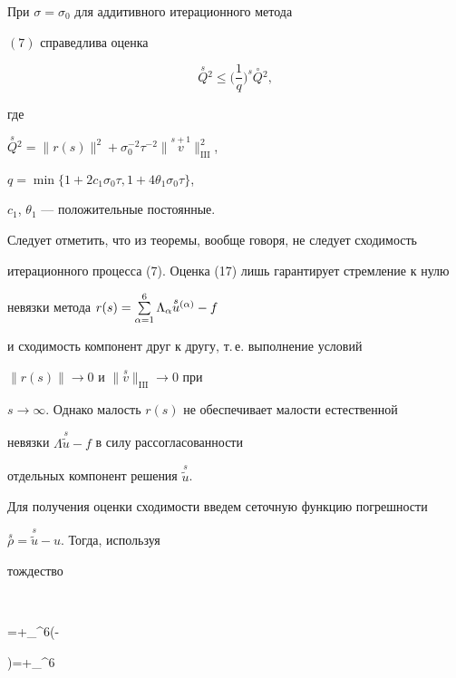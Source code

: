 \begin{thm}


При $\sigma=\sigma_0$ для аддитивного итерационного метода


$(7)$ справедлива оценка


\begin{equation}


\overset{s}{Q}{}^{2} \le \bigg(\frac{1}{q}\bigg)^{s}


\overset{\circ}{Q}{}^{2},


\end{equation}


где


$\overset{s}{Q}{}^{2}=\|r(s)\|^2+\sigma_0^{-2}\tau^{-2}


\|\overset{s+1}{v}\big\|_{\mathrm{III}}^2$,


$q=\min\{1+2c_1\sigma_0\tau,1+4\theta_1\sigma_0\tau\}$,


$c_1$, $\theta_1$ --- положительные постоянные.


\end{thm}





Следует отметить, что из теоремы, вообще говоря, не следует сходимость


итерационного процесса (7). Оценка (17) лишь гарантирует стремление к нулю


невязки метода $r(s)=\sum\limits_{\alpha=1}^6\Lambda_\alpha{\overset{s}{u}{}^{(\alpha)}}-f$


и сходимость компонент друг к другу, т.\,е. выполнение условий


$\|r(s)\|\to 0$ и $\|\overset{s}{v}\big\|_{\mathrm{III}}\to 0$ при


$s\to\infty$. Однако малость $r(s)$ не обеспечивает малости естественной


невязки $\Lambda\overset{s}{\tilde u}-f$ в силу рассогласованности


отдельных компонент решения $\overset{s}{\tilde u}$. 





Для получения оценки сходимости введем сеточную функцию погрешности


$\overset{s}{\rho}=\overset{s}{\tilde u}-u$. Тогда, используя


тождество


$$


\usa=+\sum_{}^6\bigl(\usa-


\usb\bigr)=+\sum_{}^6



